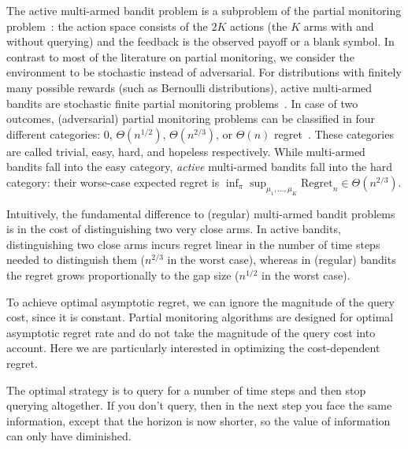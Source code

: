 \documentclass{article}
\newcommand{\regret}{\mathrm{Regret}}
\begin{document}
The active multi-armed bandit problem is
a subproblem of the partial monitoring problem~\citep{Piccolboni01}:
the action space consists of the $2K$ actions (the $K$ arms with and without querying) and
the feedback is the observed payoff or a blank symbol.
In contrast to most of the literature on partial monitoring,
we consider the environment to be stochastic instead of adversarial.
For distributions with finitely many possible rewards (such as Bernoulli distributions),
active multi-armed bandits are
stochastic finite partial monitoring problems~\citep{Komiyama15}.
In case of two outcomes,
(adversarial) partial monitoring problems can be classified in four different
categories: $0$, $\Theta(n^{1/2})$, $\Theta(n^{2/3})$, or $\Theta(n)$ regret~\citep{Antos13}.
These categories are called trivial, easy, hard, and hopeless respectively.
While multi-armed bandits fall into the easy category,
\emph{active} multi-armed bandits fall into the hard category:
their worse-case expected regret is
$\inf_\pi \sup_{\mu_1, \ldots, \mu_K} \regret_n \in \Theta(n^{2/3})$.

Intuitively, the fundamental difference to (regular) multi-armed bandit problems is in the cost of distinguishing two very close arms.
In active bandits, distinguishing two close arms incurs regret linear in the number of time steps needed to distinguish them ($n^{2/3}$ in the worst case), whereas in (regular) bandits the regret grows proportionally to the gap size ($n^{1/2}$ in the worst case).

To achieve optimal asymptotic regret, we can ignore the magnitude of the query cost, since it is constant.
Partial monitoring algorithms are designed for optimal asymptotic regret rate and do not take the magnitude of the query cost into account.
Here we are particularly interested in optimizing
the cost-dependent regret.

The optimal strategy is to query for a number of time steps
and then stop querying altogether.
If you don't query, then in the next step you face the same information,
except that the horizon is now shorter,
so the value of information can only have diminished.
\end{document}
